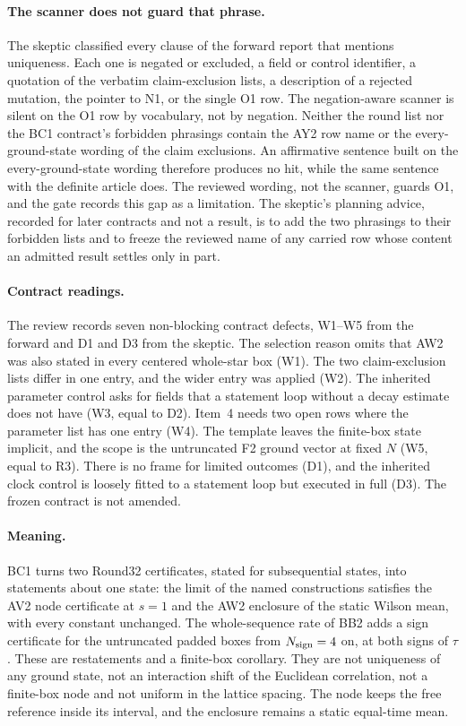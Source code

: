\paragraph{The scanner does not guard that phrase.} The skeptic classified
every clause of the forward report that mentions uniqueness. Each one is
negated or excluded, a field or control identifier, a quotation of the
verbatim claim-exclusion lists, a description of a rejected mutation, the
pointer to N1, or the single O1 row. The negation-aware scanner is silent on
the O1 row by vocabulary, not by negation. Neither the round list nor the
BC1 contract's forbidden phrasings contain the AY2 row name or the
every-ground-state wording of the claim exclusions. An affirmative sentence
built on the every-ground-state wording therefore produces no hit, while the
same sentence with the definite article does. The reviewed wording, not the
scanner, guards O1, and the gate records this gap as a limitation. The
skeptic's planning advice, recorded for later contracts and not a result, is
to add the two phrasings to their forbidden lists and to freeze the reviewed
name of any carried row whose content an admitted result settles only in
part.

\paragraph{Contract readings.} The review records seven non-blocking contract
defects, W1--W5 from the forward and D1 and D3 from the skeptic. The
selection reason omits that AW2 was also stated in every centered whole-star
box (W1). The two claim-exclusion lists differ in one entry, and the wider
entry was applied (W2). The inherited parameter control asks for fields that
a statement loop without a decay estimate does not have (W3, equal to D2).
Item~4 needs two open rows where the parameter list has one entry (W4). The
template leaves the finite-box state implicit, and the scope is the
untruncated F2 ground vector at fixed $N$ (W5, equal to R3). There is no
frame for limited outcomes (D1), and the inherited clock control is loosely
fitted to a statement loop but executed in full (D3). The frozen contract is
not amended.

\paragraph{Meaning.} BC1 turns two Round32 certificates, stated for
subsequential states, into statements about one state: the limit of the
named constructions satisfies the AV2 node certificate at $s=1$ and the AW2
enclosure of the static Wilson mean, with every constant unchanged. The
whole-sequence rate of BB2 adds a sign certificate for the untruncated
padded boxes from $N_{\rm sign}=4$ on, at both signs of $\tau$. These are
restatements and a finite-box corollary. They are not uniqueness of any
ground state, not an interaction shift of the Euclidean correlation, not a
finite-box node and not uniform in the lattice spacing. The node keeps the
free reference inside its interval, and the enclosure remains a static
equal-time mean.


